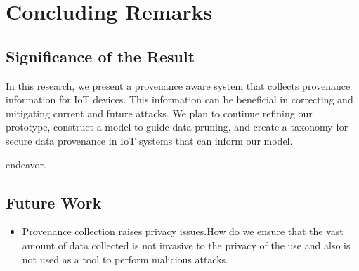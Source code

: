 
\chapter{Concluding Remarks}

\section{Significance of the Result}

In this research, we present a provenance aware system that collects provenance information for IoT devices. This information can be beneficial in correcting and mitigating current and future attacks. We plan to continue refining our prototype, construct a model to guide data pruning, and create a taxonomy for secure data provenance in IoT systems that can inform our model.

endeavor.

\section{Future Work}
\begin{itemize}

\item Provenance collection raises privacy issues.How do we ensure that the vast amount of data collected is not invasive to the privacy of the use and also is not used as a tool to perform malicious attacks.

\end{itemize}
